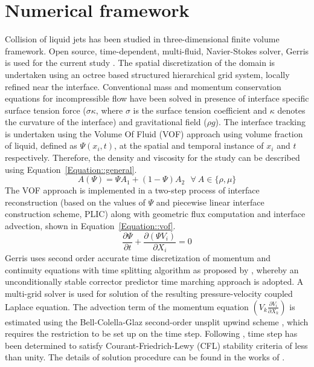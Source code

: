 \documentclass{jfm}
\begin{document}
\section{Numerical framework}
Collision of liquid jets has been studied in three-dimensional  finite volume framework. Open source, time-dependent, multi-fluid, Navier-Stokes solver, Gerris is used for the current study \citep{Popinet2003}. The spatial discretization of the domain is undertaken using an octree based structured hierarchical grid system, locally refined near the interface. Conventional mass and momentum conservation equations for incompressible flow have been solved in presence of interface specific surface tension force ($\sigma \kappa$, where $\sigma$ is the surface tension coefficient and $\kappa$ denotes the curvature of the interface) and gravitational field ($\rho g$). The interface tracking is undertaken using the Volume Of Fluid (VOF) approach using volume fraction of liquid, defined as $\Psi(x_i, t)$, at the spatial and temporal instance of $x_i$ and $t$ respectively. Therefore, the density and viscosity for the study can be described using Equation~\ref{Equation::general}.
\begin{equation} \label{Equation::general}
A (\Psi) = \Psi A_1 + (1-\Psi)A_2 \: \: \:  \forall  \: A \in \{\rho, \mu\}
\end{equation}
The VOF approach is implemented in a two-step process of interface reconstruction (based on the values of $\Psi$ and piecewise linear interface construction scheme, PLIC) along with geometric flux computation and interface advection, shown in Equation~\ref{Equation::vof}.
\begin{equation} \label{Equation::vof}
\frac{\partial \Psi}{\partial t} + \frac{\partial(\Psi V_i)}{\partial X_i} = 0
\end{equation}
Gerris uses second order accurate time discretization of momentum and continuity equations with time splitting algorithm as proposed by \cite{Chorin1968}, whereby an unconditionally stable corrector predictor time marching approach is adopted. A multi-grid solver is used for solution of the resulting pressure-velocity coupled Laplace equation. The advection term of the momentum equation $\left(V_k\frac{\partial V_i}{\partial X_k}\right)$ is estimated using the Bell-Colella-Glaz second-order unsplit upwind scheme \citep{bell1989second}, which requires the restriction to be set up on the time step. Following \cite{popinet2009}, time step has been determined to satisfy Courant-Friedrich-Lewy (CFL) stability criteria of less than unity. The details of solution procedure can be found in the works of \cite{Popinet2003,popinet2009}.\\
\end{document}
